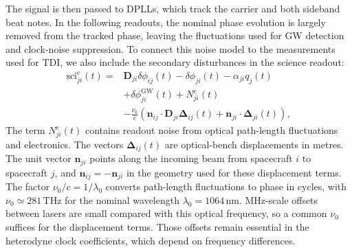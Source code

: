 The signal is then passed to \acp{DPLL}, which track the carrier and both sideband beat notes. In the following readouts, the nominal phase evolution is largely removed from the tracked phase, leaving the fluctuations used for GW detection and clock-noise suppression.
To connect this noise model to the measurements used for TDI, we also include the secondary disturbances in the science readout:
\begin{align}\label{eq:science_carrier}
    \text{sci}^{\text{c}}_{ji}(t) = & \mathbf{D}_{ji}\delta \phi_{ij}(t)-\delta \phi_{ji}(t)-\alpha_{ji}q_j(t)\nonumber\\[3pt]
    &+\delta\phi^{\mathrm{GW}}_{ji}(t)+N^{\text{c}}_{ji}(t)\nonumber\\[3pt]
    &-\frac{\nu_0}{c}\left(\mathbf{n}_{ij}\cdot \mathbf{D}_{ji}\bm{\Delta}_{ij}(t)+\mathbf{n}_{ji}\cdot\bm{\Delta}_{ji}(t)\right),
\end{align}
The term $N^{\mathrm{c}}_{ji}(t)$ contains readout noise from optical path-length fluctuations and electronics. The vectors $\bm{\Delta}_{ij}(t)$ are optical-bench displacements in metres. The unit vector $\mathbf n_{ji}$ points along the incoming beam from spacecraft $i$ to spacecraft $j$, and $\mathbf n_{ij}=-\mathbf n_{ji}$ in the geometry used for these displacement terms.
The factor $\nu_0/c=1/\lambda_0$ converts path-length fluctuations to phase in cycles, with $\nu_0\simeq281\,\mathrm{THz}$ for the nominal wavelength $\lambda_0=1064\,\mathrm{nm}$. MHz-scale offsets between lasers are small compared with this optical frequency, so a common $\nu_0$ suffices for the displacement terms. Those offsets remain essential in the heterodyne clock coefficients, which depend on frequency differences.

